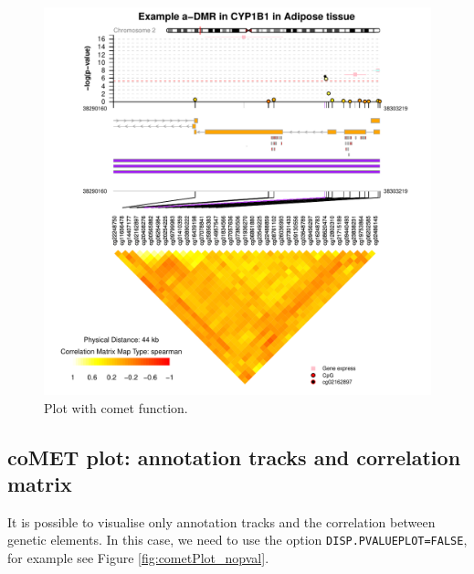 \documentclass[11pt]{article}\usepackage[]{graphicx}\usepackage[usenames,dvipsnames]{color}
\makeatletter
\def\maxwidth{ %
  \ifdim\Gin@nat@width>\linewidth
    \linewidth
  \else
    \Gin@nat@width
  \fi
}
\newenvironment{knitrout}{}{} %
\makeatother
\begin{document}
\begin{figure}
\begin{knitrout}
\color{fgcolor}

{\centering \includegraphics[width=\maxwidth]{figure/minimal-cometPlot} 

}



\end{knitrout}
\caption{Plot with comet function.\label{fig:cometPlot}}
\end{figure}

\subsection{coMET plot: annotation tracks and correlation matrix}  
It is possible to visualise only annotation tracks and the correlation between genetic elements.
In this case, we need to use the option \texttt{DISP.PVALUEPLOT=FALSE}, for example see Figure \ref{fig:cometPlot_nopval}.
\end{document}
